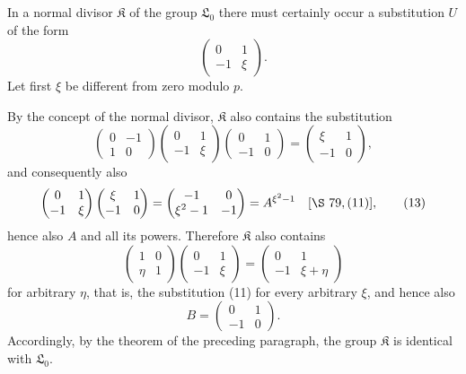 \documentclass[11pt]{article}
\newcommand{\Lzero}{\mathfrak L_0}
\newcommand{\Kgrp}{\mathfrak K}
\begin{document}
In a normal divisor $\Kgrp$ of the group $\Lzero$ there must certainly occur a substitution $U$ of the form
\begin{equation}
 \begin{pmatrix}0&1\\-1&\xi\end{pmatrix}.
\tag{11}
\end{equation}
Let first $\xi$ be different from zero modulo $p$.

By the concept of the normal divisor, $\Kgrp$ also contains the substitution
\begin{equation}
 \begin{pmatrix}0&-1\\1&0\end{pmatrix}
 \begin{pmatrix}0&1\\-1&\xi\end{pmatrix}
 \begin{pmatrix}0&1\\-1&0\end{pmatrix}
 =
 \begin{pmatrix}\xi&1\\-1&0\end{pmatrix},
\tag{12}
\end{equation}
and consequently also
\begin{equation}
 \begin{pmatrix}0&1\\-1&\xi\end{pmatrix}
 \begin{pmatrix}\xi&1\\-1&0\end{pmatrix}
 =
 \begin{pmatrix}-1&0\\ \xi^2-1&-1\end{pmatrix}
 =A^{\xi^2-1}\quad[\S~79,(11)],
\tag{13}
\end{equation}
hence also $A$ and all its powers. Therefore $\Kgrp$ also contains
\begin{equation}
 \begin{pmatrix}1&0\\ \eta&1\end{pmatrix}
 \begin{pmatrix}0&1\\-1&\xi\end{pmatrix}
 =
 \begin{pmatrix}0&1\\-1&\xi+
\eta\end{pmatrix}
\tag{14}
\end{equation}
for arbitrary $\eta$, that is, the substitution (11) for every arbitrary $\xi$, and hence also
\[
 B=\begin{pmatrix}0&1\\-1&0\end{pmatrix}.
\]
Accordingly, by the theorem of the preceding paragraph, the group $\Kgrp$ is identical with $\Lzero$.
\end{document}
